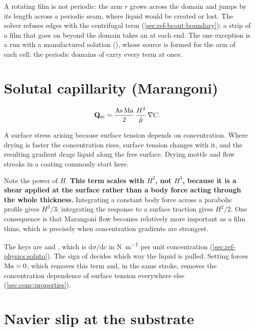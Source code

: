A rotating film is not periodic: the arm $r$ grows across the domain and jumps
by its length across a periodic seam, where liquid would be created or lost.
The solver refuses  edges with the centrifugal term
(\cref{sec:ref-bcout:boundary}); a strip of a film that goes on beyond the domain
takes an  at each end. The one exception is a run with a
manufactured solution (), whose source is
formed for the arm of each cell: the periodic domains of 
carry every term at once.

\section{Solutal capillarity (Marangoni)}
\label{sec:terms:marangoni}

\begin{equation}\label{eq:q-sc}
  \mathbf{Q}_{\mathrm{sc}} = \frac{\mathrm{As}\,\mathrm{Ma}}{2}\,\frac{H^{2}}{\hat{\mu}}\,\nabla C.
\end{equation}

A surface stress arising because surface tension depends on concentration.
Where drying is faster the concentration rises, surface tension changes with
it, and the resulting gradient drags liquid along the free surface. Drying
mottle and flow streaks in a coating commonly start here.

Note the power of $H$. \textbf{This term scales with $H^{2}$, not $H^{3}$,
because it is a shear applied at the surface rather than a body force acting
through the whole thickness.} Integrating a constant body force across a
parabolic profile gives $H^{3}/3$; integrating the response to a surface
traction gives $H^{2}/2$. One consequence is that Marangoni flow becomes
relatively more important as a film thins, which is precisely when
concentration gradients are strongest.

The keys are  and
, which is $\mathrm{d}\sigma/\mathrm{d}c$ in
\si{\newton\per\metre} per unit concentration
(\cref{sec:ref-physics:soluto}). The sign of  decides which way the
liquid is pulled. Setting  forces $\mathrm{Ma} = 0$, which removes
this term and, in the same stroke, removes the concentration dependence of
surface tension everywhere else (\cref{sec:conc:properties}).

\section{Navier slip at the substrate}
\label{sec:terms:slip}

